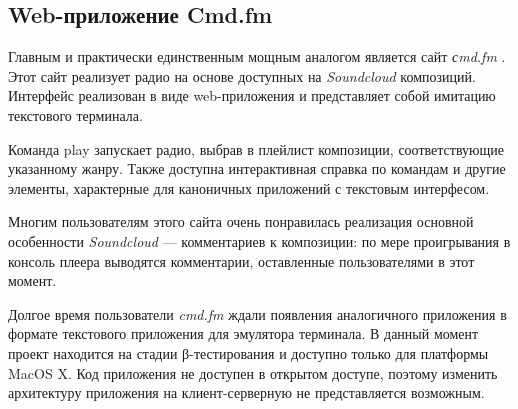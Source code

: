 \subsection{Web-приложение Cmd.fm}

Главным и практически единственным мощным аналогом является сайт
\textit{сmd.fm} \cite{cmd-fm:main}. Этот сайт реализует радио на основе доступных на
\textit{Soundcloud} композиций. Интерфейс реализован в виде
web-приложения и представляет собой имитацию текстового терминала.


Команда play запускает радио, выбрав в плейлист
композиции, соответствующие указанному жанру. Также доступна
интерактивная  справка по командам и другие элементы, характерные для
каноничных приложений с текстовым интерфесом. 

Многим пользователям этого сайта очень понравилась \cite{stubler:cmdfm}
реализация основной особенности \textit{Soundcloud} --- комментариев к
композиции: по мере проигрывания в консоль плеера выводятся
комментарии, оставленные пользователями в этот момент. 

Долгое время пользователи \textit{cmd.fm} ждали появления аналогичного
приложения в формате текстового приложения для эмулятора
терминала. В данный момент проект находится на стадии
β-тестирования и доступно только для платформы MacOS X. Код
приложения не доступен в открытом доступе, поэтому изменить
архитектуру приложения на клиент-серверную не представляется возможным.
